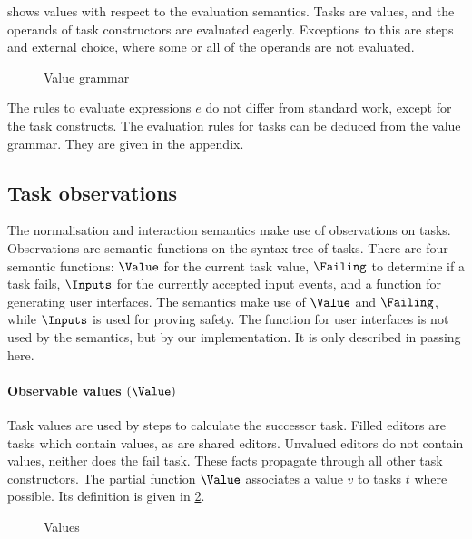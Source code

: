  shows values with respect to the evaluation semantics.
Tasks are values, and the operands of task constructors are evaluated eagerly.
Exceptions to this are steps and external choice, where some or all of the operands are not evaluated.

\begin{figure}[h]
  \small
  \caption{Value grammar} \label{fig:value-grammar}
\end{figure}

The rules to evaluate expressions $e$ do not differ from standard work, except for the task constructs.
The evaluation rules for tasks can be deduced from the value grammar.
They are given in the appendix.


\subsection{Task observations}

The normalisation and interaction semantics make use of observations on tasks.
Observations are semantic functions on the syntax tree of tasks.
There are four semantic functions: $\Value$ for the current task value, $\Failing$ to determine if a task fails, $\Inputs$ for the currently accepted input events, and a function for generating user interfaces.
The semantics make use of $\Value$ and $\Failing$, while $\Inputs$ is used for proving safety.
The function for user interfaces is not used by the semantics, but by our implementation.
It is only described in passing here.




\paragraph{Observable values $(\Value)$}

Task values are used by steps to calculate the successor task.
Filled editors are tasks which contain values, as are shared editors.
Unvalued editors do not contain values, neither does the fail task.
These facts propagate through all other task constructors.
The partial function $\Value$ associates a value $v$ to tasks $t$ where possible.
Its definition is given in \cref{fig:observation-value}.

\begin{figure}[h]
  \small
  \caption{Values} \label{fig:observation-value}
\end{figure}

